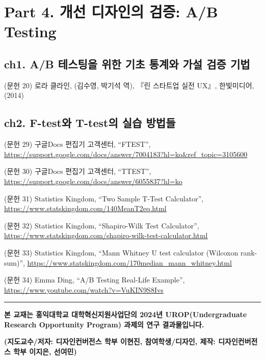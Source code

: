 \documentclass[
  letterpaper,
]{book}
\begin{document}

\chapter*{Part 4. 개선 디자인의 검증: A/B
Testing}\label{part-4.-uxac1cuxc120-uxb514uxc790uxc778uxc758-uxac80uxc99d-ab-testing-2}


\section*{ch1. A/B 테스팅을 위한 기초 통계와 가설 검증
기법}\label{ch1.-ab-uxd14cuxc2a4uxd305uxc744-uxc704uxd55c-uxae30uxcd08-uxd1b5uxacc4uxc640-uxac00uxc124-uxac80uxc99d-uxae30uxbc95-1}


(문헌 20) 로라 클라인, (김수영, 박기석 역), 『린 스타트업 실전 UX』,
한빛미디어,(2014)

\section*{ch2. F-test와 T-test의 실습
방법들}\label{ch2.-f-testuxc640-t-testuxc758-uxc2e4uxc2b5-uxbc29uxbc95uxb4e4-1}


(문헌 29) 구글Docs 편집기 고객센터, ``FTEST'',
\url{https://support.google.com/docs/answer/7004183?hl=ko&ref_topic=3105600}

(문헌 30) 구글Docs 편집기 고객센터, ``TTEST'',
\url{https://support.google.com/docs/answer/6055837?hl=ko}

(문헌 31) Statistics Kingdom, ``Two Sample T-Test Calculator'',
\url{https://www.statskingdom.com/140MeanT2eq.html}

(문헌 32) Statistics Kingdom, ``Shapiro-Wilk Test Calculator'',
\url{https://www.statskingdom.com/shapiro-wilk-test-calculator.html}

(문헌 33) Statistics Kingdom, ``Mann Whitney U test calculator (Wilcoxon
rank-sum)'',
\url{https://www.statskingdom.com/170median_mann_whitney.html}

(문헌 34) Emma Ding, ``A/B Testing Real-Life Example'',
\url{https://www.youtube.com/watch?v=VuKIN9S8Ivs}

\begin{center}\rule{0.5\linewidth}{0.5pt}\end{center}

\textbf{본 교재는 홍익대학교 대학혁신지원사업단의 2024년
UROP(Undergraduate Research Opportunity Program) 과제의 연구
결과물입니다.}

\textbf{(지도교수/저자: 디자인컨버전스 학부 이현진, 참여학생/디자인,
제작: 디자인컨버전스 학부 이지은, 선여민)}


\backmatter
\printbibliography


\printindex
\end{document}
